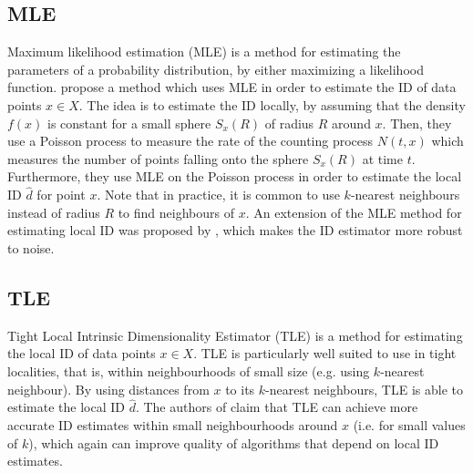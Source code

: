 \subsection{MLE}
\label{sec:id-estimation-mle}
Maximum likelihood estimation (MLE) is a method for estimating the parameters of a probability distribution, by either maximizing a likelihood function. \cite{Levina2004} propose a method which uses MLE in order to estimate the ID of data points $x \in X$. The idea is to estimate the ID locally, by assuming that the density $f(x)$ is constant for a small sphere $S_x(R)$ of radius $R$ around $x$. Then, they use a Poisson process to measure the rate of the counting process $N(t, x)$ which measures the number of points falling onto the sphere $S_x(R)$ at time $t$. Furthermore, they use MLE on the Poisson process in order to estimate the local ID $\hat{d}$ for point $x$. Note that in practice, it is common to use $k$-nearest neighbours instead of radius $R$ to find neighbours of $x$. An extension of the MLE method for estimating local ID was proposed by \cite{Haro2008}, which makes the ID estimator more robust to noise.

\subsection{TLE}
\label{sec:id-estimation-tle}
Tight Local Intrinsic Dimensionality Estimator (TLE) \cite{Amsaleg2019} is a method for estimating the local ID of data points $x \in X$. TLE is particularly well suited to use in tight localities, that is, within neighbourhoods of small size (e.g. using $k$-nearest neighbour). By using distances from $x$ to its $k$-nearest neighbours, TLE is able to estimate the local ID $\hat{d}$. The authors of \cite{Amsaleg2019} claim that TLE can achieve more accurate ID estimates within small neighbourhoods around $x$ (i.e. for small values of $k$), which again can improve quality of algorithms that depend on local ID estimates.